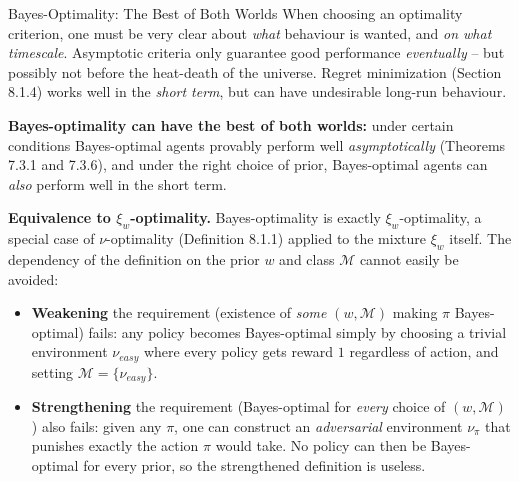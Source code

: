\documentclass[aspectratio=169,10pt]{beamer}
\begin{document}
\begin{frame}{Bayes-Optimality: The Best of Both Worlds}
  When choosing an optimality criterion, one must be very clear about
  \emph{what} behaviour is wanted, and \emph{on what timescale}. Asymptotic
  criteria only guarantee good performance \emph{eventually} -- but possibly
  not before the heat-death of the universe. Regret minimization (Section
  8.1.4) works well in the \emph{short term}, but can have undesirable
  long-run behaviour.

  \bigskip
  \textbf{Bayes-optimality can have the best of both worlds:} under certain
  conditions Bayes-optimal agents provably perform well
  \emph{asymptotically} (Theorems 7.3.1 and 7.3.6), and under the right
  choice of prior, Bayes-optimal agents can \emph{also} perform well in the
  short term.

  \bigskip
  \textbf{Equivalence to $\xi_w$-optimality.} Bayes-optimality is exactly
  $\xi_w$-optimality, a special case of $\nu$-optimality (Definition 8.1.1)
  applied to the mixture $\xi_w$ itself. The dependency of the definition on
  the prior $w$ and class $\mathcal{M}$ cannot easily be avoided:
  \begin{itemize}
    \item \textbf{Weakening} the requirement (existence of \emph{some}
      $(w,\mathcal{M})$ making $\pi$ Bayes-optimal) fails: any policy
      becomes Bayes-optimal simply by choosing a trivial environment
      $\nu_{easy}$ where every policy gets reward $1$ regardless of action,
      and setting $\mathcal{M}=\{\nu_{easy}\}$.
    \item \textbf{Strengthening} the requirement (Bayes-optimal for
      \emph{every} choice of $(w,\mathcal{M})$) also fails: given any $\pi$,
      one can construct an \emph{adversarial} environment $\nu_\pi$ that
      punishes exactly the action $\pi$ would take. No policy can then be
      Bayes-optimal for every prior, so the strengthened definition is
      useless.
  \end{itemize}
\end{frame}
\end{document}
